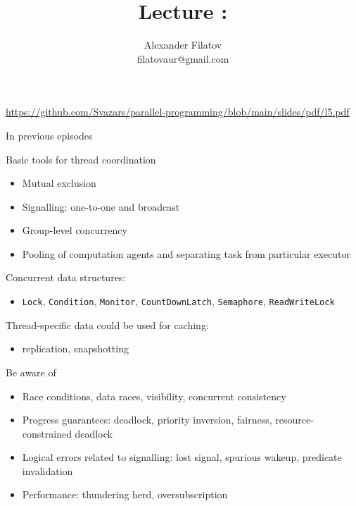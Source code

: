 


\title[]{Lecture \patternsNum: \patternsTopic}
\subtitle[]{\patternsKey}
\author[]{Alexander Filatov\\ filatovaur@gmail.com}

\date{}



\begin{frame}
  \titlepage
  \url{https://github.com/Svazars/parallel-programming/blob/main/slides/pdf/l5.pdf}
\end{frame}

\begin{frame}{In previous episodes}

Basic tools for thread coordination
\begin{itemize}
    \item Mutual exclusion
    \item Signalling: one-to-one and broadcast
    \item Group-level concurrency
    \item Pooling of computation agents and separating task from particular executor
\end{itemize}

Concurrent data structures:
\begin{itemize}
    \item \texttt{Lock}, \texttt{Condition}, \texttt{Monitor}, \texttt{CountDownLatch}, \texttt{Semaphore}, \texttt{ReadWriteLock}
\end{itemize}

Thread-specific data could be used for caching: 
\begin{itemize}
  \item replication, snapshotting
\end{itemize}

Be aware of
\begin{itemize}
    \item Race conditions, data races, visibility, concurrent consistency
    \item Progress guarantees: deadlock, priority inversion, fairness, resource-constrained deadlock 
    \item Logical errors related to signalling: lost signal, spurious wakeup, predicate invalidation
    \item Performance: thundering herd, oversubscription
\end{itemize}
\end{frame}

